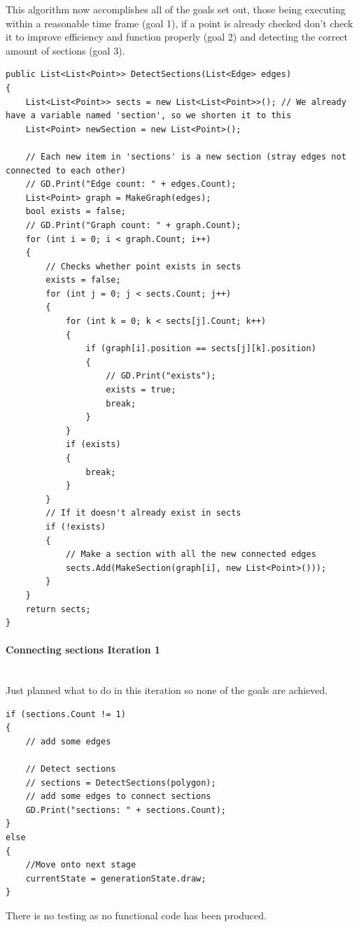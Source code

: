 \documentclass{article}
\newcommand{\myparagraph}[1]{\paragraph{#1}\mbox{}\\} %
\begin{document}
This algorithm now accomplishes all of the goals set out, those being executing within a reasonable time frame (goal 1), if a point is already checked don't check it to improve efficiency and function properly (goal 2) and detecting the correct amount of sections (goal 3).
\begin{lstlisting}
public List<List<Point>> DetectSections(List<Edge> edges)
{
    List<List<Point>> sects = new List<List<Point>>(); // We already have a variable named 'section', so we shorten it to this
    List<Point> newSection = new List<Point>();

    // Each new item in 'sections' is a new section (stray edges not connected to each other)
    // GD.Print("Edge count: " + edges.Count);
    List<Point> graph = MakeGraph(edges);
    bool exists = false;
    // GD.Print("Graph count: " + graph.Count);
    for (int i = 0; i < graph.Count; i++)
    {
        // Checks whether point exists in sects
        exists = false;
        for (int j = 0; j < sects.Count; j++)
        {
            for (int k = 0; k < sects[j].Count; k++)
            {
                if (graph[i].position == sects[j][k].position)
                {
                    // GD.Print("exists");
                    exists = true;
                    break;
                }
            }
            if (exists)
            {
                break;
            }
        }
        // If it doesn't already exist in sects
        if (!exists)
        {
            // Make a section with all the new connected edges
            sects.Add(MakeSection(graph[i], new List<Point>()));
        }
    }
    return sects;
}
\end{lstlisting}

\myparagraph{Connecting sections Iteration 1}
Just planned what to do in this iteration so none of the goals are achieved.
\begin{lstlisting}
if (sections.Count != 1)
{
    // add some edges
                
    // Detect sections
    // sections = DetectSections(polygon);
    // add some edges to connect sections
    GD.Print("sections: " + sections.Count);
}
else
{
	//Move onto next stage
    currentState = generationState.draw;
}

\end{lstlisting}
 
 There is no testing as no functional code has been produced.
\end{document}
